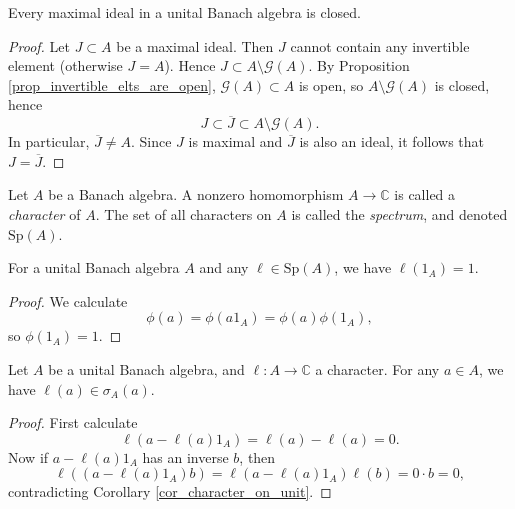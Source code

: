 \documentclass[12pt]{article}
\begin{document}
\begin{proposition} %
\label{prop_max_ideals_closed}
	Every maximal ideal in a unital Banach algebra is closed.
\end{proposition}
\begin{proof}
	Let $J\subset A$ be a maximal ideal. Then $J$ cannot contain any invertible element (otherwise $J=A$). Hence $J \subset A \setminus \mathcal{G}(A)$. By Proposition \ref{prop_invertible_elts_are_open}, $\mathcal{G}(A)\subset A$ is open, so $A \setminus \mathcal{G}(A)$ is closed, hence 
	\begin{equation*}
		J \subset \overline{J} \subset A \setminus \mathcal{G}(A).
	\end{equation*}
	In particular, $\overline{J}\neq A$. Since $J$ is maximal and $\overline{J}$ is also an ideal, it follows that $J=\overline{J}$. 
\end{proof}

\begin{definition} %
	Let $A$ be a Banach algebra. A nonzero homomorphism $A\to\mathbb{C}$ is called a \emph{character} of $A$. The set of all characters on $A$ is called the \emph{spectrum}, and denoted $\text{Sp}(A)$.
\end{definition}

\begin{corollary}
\label{cor_character_on_unit}
	For a unital Banach algebra $A$ and any $\ell\in\text{Sp}(A)$, we have $\ell(1_A)=1$.
\end{corollary}
\begin{proof}
	We calculate
	\begin{equation*}
		\phi(a) = \phi(a1_A) = \phi(a)\phi(1_A),
	\end{equation*}
	so $\phi(1_A)=1$.
\end{proof}

\begin{corollary}
\label{cor_character_at_point_is_in_spectrum}
	Let $A$ be a unital Banach algebra, and $\ell: A\to\mathbb{C}$ a character. For any $a\in A$, we have $\ell(a)\in\sigma_A(a)$.
\end{corollary}
\begin{proof}
	First calculate 
	\begin{equation*}
		\ell(a - \ell(a)1_A) = \ell(a) - \ell(a) = 0.
	\end{equation*}
	Now if $a-\ell(a)1_A$ has an inverse $b$, then 
	\begin{equation*}
		\ell((a-\ell(a)1_A)b) = \ell(a-\ell(a)1_A)\ell(b) = 0\cdot b = 0,
	\end{equation*}
	contradicting Corollary \ref{cor_character_on_unit}. 
\end{proof}
\end{document}

